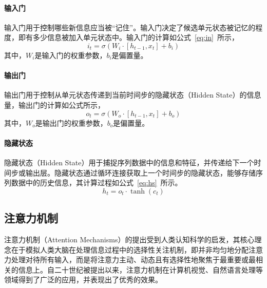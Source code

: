 \paragraph{输入门}

输入门用于控制哪些新信息应当被“记住”。输入门决定了候选单元状态被记忆的程度，即有多少信息被加入单元状态中。输入门的计算如公式~\ref{eq:in}~所示，
\begin{equation}
    i_t = \sigma(W_i \cdot [h_{t-1}, x_t] + b_i)
    \label{eq:in}
\end{equation}
其中，\(W_i\)是输入门的权重参数，\(b_i\)是偏置量。

\paragraph{输出门}

输出门用于控制从单元状态传递到当前时间步的隐藏状态（Hidden State）的信息量，输出门的计算如公式所示，
\begin{equation}
    o_t = \sigma(W_o \cdot [h_{t-1}, x_t] + b_o)
    \label{eq:out}
\end{equation}
其中，\(W_o\)是输出门的权重参数，\(b_o\)是偏置量。

\paragraph{隐藏状态}

隐藏状态（Hidden State）用于捕捉序列数据中的信息和特征，并传递给下一个时间步或输出层。隐藏状态通过循环连接获取上一个时间步的隐藏状态，能够存储序列数据中的历史信息，其计算过程如公式~\ref{eq:hs}~所示。
\begin{equation}
    h_t = o_t \cdot \tanh(c_t)
    \label{eq:hs}
\end{equation}

\subsection{注意力机制}

注意力机制（Attention Mechanisms）的提出受到人类认知科学的启发，其核心理念在于模拟人类大脑在处理信息过程中的选择性关注机制，即并非均匀地分配注意力处理对待所有输入，而是将注意力主动、动态且有选择性地聚焦于最重要或最相关的信息上。自二十世纪被提出以来\cite{730558}，注意力机制在计算机视觉、自然语言处理等领域得到了广泛的应用，并表现出了优秀的效果。

